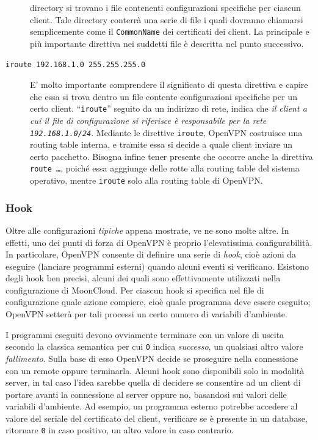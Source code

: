 \begin{description}
	directory si trovano i file contenenti configurazioni specifiche per ciascun client.
	Tale directory conterrà una serie di file i quali dovranno chiamarsi semplicemente
	come il \texttt{CommonName} dei certificati dei client. La principale e più
	importante direttiva nei suddetti file è descritta nel punto successivo.
	\item[\texttt{iroute 192.168.1.0 255.255.255.0}]E' molto importante comprendere
	il significato di questa direttiva e capire che essa si trova dentro un file
	contente configurazioni specifiche per un certo client. ``\texttt{iroute}'' seguito
	da un indirizzo di rete, indica che \textit{il client a cui il file di configurazione
		si riferisce è responsabile per la rete \texttt{192.168.1.0/24}}. Mediante le
	direttive \texttt{iroute}, OpenVPN costruisce una routing table interna,
	e tramite essa si
	decide a quale client inviare un certo pacchetto. Bisogna infine tener presente
	che occorre anche la direttiva \texttt{route \ldots}, poiché essa agggiunge delle
	rotte alla routing table del sistema operativo, mentre \texttt{iroute} solo
	alla routing table di OpenVPN.
\end{description}

\subsubsection{Hook}
Oltre alle configurazioni \textit{tipiche} appena mostrate, ve ne sono molte altre. In effetti,
uno dei punti di forza di OpenVPN è proprio l'elevatissima configurabilità.
In particolare, OpenVPN consente di definire una serie di \textit{hook},
cioè azioni da eseguire (lanciare programmi esterni) quando alcuni eventi si verificano.
Esistono degli hook ben precisi, alcuni dei quali sono effettivamente utilizzati
nella configurazione di MoonCloud. Per ciascun hook si specifica nel file di configurazione
quale azione compiere, cioè quale programma deve essere eseguito;
OpenVPN setterà per tali processi un certo numero di variabili d'ambiente.

I programmi eseguiti devono ovviamente terminare con un valore di uscita secondo
la classica semantica per cui \texttt{0} indica \textit{successo}, un qualsiasi
altro valore \textit{fallimento}. Sulla base
di esso OpenVPN decide se proseguire nella connessione con un remote oppure terminarla.
Alcuni hook sono disponibili solo in modalità server, in tal caso
l'idea sarebbe quella di decidere se consentire ad un client di portare avanti
la connessione al server oppure no, basandosi sui valori delle variabili d'ambiente.
Ad esempio, un programma esterno potrebbe accedere al valore del seriale del certificato
del client, verificare se è presente in un database, ritornare \texttt{0} in caso
positivo, un altro valore in caso contrario.

